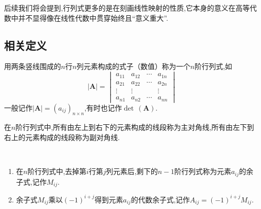 \begin{red}
    \begin{remark}
        后续我们将会提到,行列式更多的是在刻画线性映射的性质,它本身的意义在高等代数中并不显得像在线性代数中贯穿始终且“意义重大”.
    \end{remark}
\end{red}
\vfill
\subsection{相关定义}
\begin{formal}
\begin{definition}[行列式的形式]\label{def:行列式的形式}
    用两条竖线围成的$n$行$n$列元素构成的式子（数值）称为一个$n$阶行列式,如
    \[
    \left|\bm{A}\right|=\begin{vmatrix}
        a_{11} & a_{12} & \cdots & a_{1n} \\
        a_{21} & a_{22} & \cdots & a_{2n} \\
        \vdots & \vdots &  & \vdots \\
        a_{n1} & a_{n2} & \cdots & a_{nn}
    \end{vmatrix}
    \]一般记作$\left|\bm{A}\right|=\left(a_{ij}\right)_{n\times n}$,有时也记作$\det\,\left(\bm{A}\right)$.
\end{definition}
\end{formal}
\begin{formal}
\begin{definition}[对角线]\label{def:对角线}
    在$n$阶行列式中,所有由左上到右下的元素构成的线段称为主对角线,所有由左下到右上的元素构成的线段称为副对角线.
\end{definition}
\end{formal}
\begin{formal}
\begin{definition}[余子式与代数余子式]\label{def:余子式与代数余子式}\,
    \begin{enumerate}[label = {\textup{(\arabic*)}}]
        \item 在$n$阶行列式中,去掉第$i$行第$j$列元素后,剩下的$n-1$阶行列式称为元素$a_{ij}$的余子式,记作$M_{ij}$.
        \item 
    余子式$M_{ij}$乘以$(-1)^{i+j}$得到元素$a_{ij}$的代数余子式,记作$\displaystyle
    A_{ij}=\left(-1\right)^{i+j}M_{ij}$.
    \end{enumerate}
\end{definition}
\end{formal}
